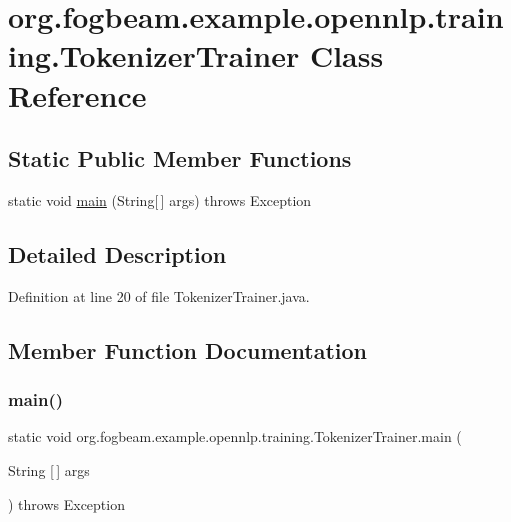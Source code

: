 \hypertarget{classorg_1_1fogbeam_1_1example_1_1opennlp_1_1training_1_1_tokenizer_trainer}{}\section{org.\+fogbeam.\+example.\+opennlp.\+training.\+Tokenizer\+Trainer Class Reference}
\label{classorg_1_1fogbeam_1_1example_1_1opennlp_1_1training_1_1_tokenizer_trainer}
\subsection*{Static Public Member Functions}
\begin{DoxyCompactItemize}
\item 
static void \hyperlink{classorg_1_1fogbeam_1_1example_1_1opennlp_1_1training_1_1_tokenizer_trainer_ae7cb041680d5e391fb77b3662a1504bd}{main} (String\mbox{[}$\,$\mbox{]} args)  throws Exception 	
\end{DoxyCompactItemize}


\subsection{Detailed Description}


Definition at line 20 of file Tokenizer\+Trainer.\+java.



\subsection{Member Function Documentation}
\hypertarget{classorg_1_1fogbeam_1_1example_1_1opennlp_1_1training_1_1_tokenizer_trainer_ae7cb041680d5e391fb77b3662a1504bd}{}\label{classorg_1_1fogbeam_1_1example_1_1opennlp_1_1training_1_1_tokenizer_trainer_ae7cb041680d5e391fb77b3662a1504bd} 
\subsubsection{\texorpdfstring{main()}{main()}}
{\footnotesize\ttfamily static void org.\+fogbeam.\+example.\+opennlp.\+training.\+Tokenizer\+Trainer.\+main (\begin{DoxyParamCaption}\item[{String \mbox{[}$\,$\mbox{]}}]{args }\end{DoxyParamCaption}) throws Exception\hspace{0.3cm}{\ttfamily [static]}}



